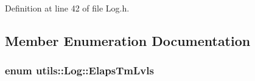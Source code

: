 Definition at line 42 of file Log.\+h.



\subsection{Member Enumeration Documentation}
\subsubsection[{\texorpdfstring{Elaps\+Tm\+Lvls}{ElapsTmLvls}}]{\setlength{\rightskip}{0pt plus 5cm}enum {\bf utils\+::\+Log\+::\+Elaps\+Tm\+Lvls}}\hypertarget{classutils_1_1Log_aeb031aea7d8d59f98a6857915d32e864}{}\label{classutils_1_1Log_aeb031aea7d8d59f98a6857915d32e864}
